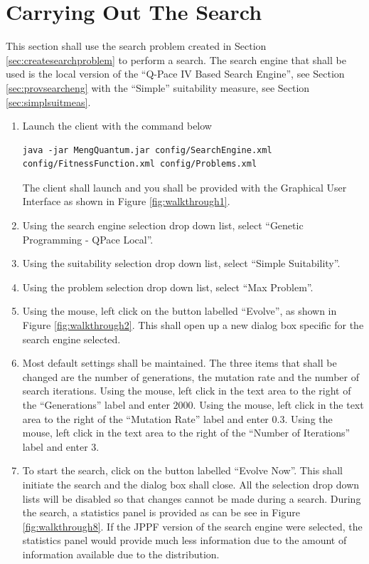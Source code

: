 \section{Carrying Out The Search}
\label{sec:carryingoutthesearch}

This section shall use the search problem created in Section \ref{sec:createsearchproblem} to perform a search.
The search engine that shall be used is the local version of the ``Q-Pace IV Based Search Engine'', see Section \ref{sec:provsearcheng} with the ``Simple'' suitability measure, see Section \ref{sec:simplsuitmeas}.

\begin{enumerate}
 \item Launch the client with the command below
\begin{lstlisting}
java -jar MengQuantum.jar config/SearchEngine.xml config/FitnessFunction.xml config/Problems.xml
\end{lstlisting}
The client shall launch and you shall be provided with the Graphical User Interface as shown in Figure \ref{fig:walkthrough1}.

\item Using the search engine selection drop down list, select ``Genetic Programming - QPace Local''.

\item Using the suitability selection drop down list, select ``Simple Suitability''.

\item Using the problem selection drop down list, select ``Max Problem''.

\item Using the mouse, left click on the button labelled ``Evolve'', as shown in Figure \ref{fig:walkthrough2}.
This shall open up a new dialog box specific for the search engine selected.

\item \label{enum:searchsettings} Most default settings shall be maintained.
The three items that shall be changed are the number of generations, the mutation rate and the number of search iterations.
Using the mouse, left click in the text area to the right of the ``Generations'' label and enter $2000$.
Using the mouse, left click in the text area to the right of the ``Mutation Rate'' label and enter $0.3$.
Using the mouse, left click in the text area to the right of the ``Number of Iterations'' label and enter $3$.

\item To start the search, click on the button labelled ``Evolve Now''.
This shall initiate the search and the dialog box shall close.
All the selection drop down lists will be disabled so that changes cannot be made during a search.
During the search, a statistics panel is provided as can be see in Figure \ref{fig:walkthrough8}.
If the JPPF version of the search engine were selected,  the statistics panel would provide much less information due to the amount of information available due to the distribution.


\end{enumerate}
